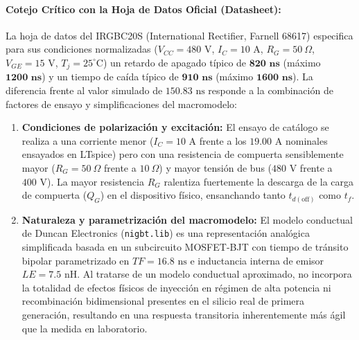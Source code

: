 \documentclass[11pt,a4paper]{article}
\begin{document}
\paragraph{Cotejo Crítico con la Hoja de Datos Oficial (Datasheet):}
La hoja de datos del IRGBC20S (International Rectifier, Farnell 68617) especifica para sus condiciones normalizadas ($V_{CC} = 480\text{ V}$, $I_C = 10\text{ A}$, $R_G = 50\ \Omega$, $V_{GE} = 15\text{ V}$, $T_j = 25^\circ\text{C}$) un retardo de apagado típico de $\bm{820\text{ ns}}$ (máximo $\bm{1200\text{ ns}}$) y un tiempo de caída típico de $\bm{910\text{ ns}}$ (máximo $\bm{1600\text{ ns}}$). La diferencia frente al valor simulado de $150.83\text{ ns}$ responde a la combinación de factores de ensayo y simplificaciones del macromodelo:
\begin{enumerate}[leftmargin=*, noitemsep, topsep=2pt]
  \item \textbf{Condiciones de polarización y excitación:} El ensayo de catálogo se realiza a una corriente menor ($I_C = 10\text{ A}$ frente a los $19.00\text{ A}$ nominales ensayados en LTspice) pero con una resistencia de compuerta sensiblemente mayor ($R_G = 50\ \Omega$ frente a $10\ \Omega$) y mayor tensión de bus ($480\text{ V}$ frente a $400\text{ V}$). La mayor resistencia $R_G$ ralentiza fuertemente la descarga de la carga de compuerta ($Q_G$) en el dispositivo físico, ensanchando tanto $t_{d(\text{off})}$ como $t_f$.
  \item \textbf{Naturaleza y parametrización del macromodelo:} El modelo conductual de Duncan Electronics (\texttt{nigbt.lib}) es una representación analógica simplificada basada en un subcircuito MOSFET-BJT con tiempo de tránsito bipolar parametrizado en $TF = 16.8\text{ ns}$ e inductancia interna de emisor $LE = 7.5\text{ nH}$. Al tratarse de un modelo conductual aproximado, no incorpora la totalidad de efectos físicos de inyección en régimen de alta potencia ni recombinación bidimensional presentes en el silicio real de primera generación, resultando en una respuesta transitoria inherentemente más ágil que la medida en laboratorio.
\end{enumerate}
\end{document}
